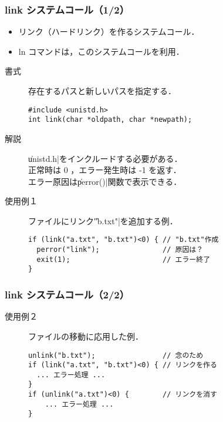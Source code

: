 \documentclass{beamer}                 %
\begin{document}
\begin{frame}[fragile]
  \frametitle{link システムコール（1/2）}
  \begin{itemize}
  \item リンク（ハードリンク）を作るシステムコール．
  \item ln コマンドは，このシステムコールを利用．
  \end{itemize}

  \begin{description}
  \item[書式]  存在するパスと新しいパスを指定する．
\begin{verbatim}
#include <unistd.h>
int link(char *oldpath, char *newpath);
\end{verbatim}

  \item[解説] \|unistd.h|をインクルードする必要がある．\\
  正常時は 0 ，エラー発生時は -1 を返す．\\
  エラー原因は\|perror()|関数で表示できる．

  \item[使用例１] ファイルにリンク\|"b.txt"|を追加する例．
\begin{verbatim}
if (link("a.txt", "b.txt")<0) { // "b.txt"作成
  perror("link");               // 原因は？
  exit(1);                      // エラー終了
}
\end{verbatim}
  \end{description}
\end{frame}

\begin{frame}[fragile]
  \frametitle{link システムコール（2/2）}
  \begin{description}
  \item[使用例２] ファイルの移動に応用した例．
\begin{verbatim}
unlink("b.txt");                // 念のため
if (link("a.txt", "b.txt")<0) { // リンクを作る
  ... エラー処理 ...
}
if (unlink("a.txt")<0) {        // リンクを消す
    ... エラー処理 ...
}
\end{verbatim}
  \end{description}
\end{frame}
\end{document}
